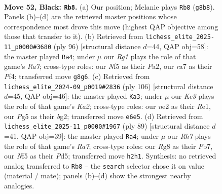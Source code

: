 \documentclass[11pt]{article}
\begin{document}
\clearpage

\begin{figure}[p]\centering
\begin{subfigure}{0.46\textwidth}\centering
\resizebox{\linewidth}{!}{%
\newchessgame
\chessboard[
  setfen={6r1/R7/3pk3/5npp/8/1p6/1R2NKPr/8 b - - 3 52},
  showmover=false,
  pgfstyle=straightmove, color=movearrow, markmove={g8-b8}
]}
\caption{}
\end{subfigure}\hfill
\begin{subfigure}{0.46\textwidth}\centering
\resizebox{\linewidth}{!}{%
\newchessgame
\chessboard[
  setfen={4r3/R3Pk2/2r5/8/2p2P2/2R3P1/P7/6K1 w - - 3 49},
  showmover=false,
  pgfstyle=straightmove, color=movearrow, markmove={a7-a4}
]}
\caption{}
\end{subfigure}
\\[4pt]
\begin{subfigure}{0.46\textwidth}\centering
\resizebox{\linewidth}{!}{%
\newchessgame
\chessboard[
  setfen={4r3/1nk1P3/8/p3R3/2P5/1P6/KP4b1/4R3 w - - 1 54},
  showmover=false,
  pgfstyle=straightmove, color=movearrow, markmove={a2-a3}
]}
\caption{}
\end{subfigure}\hfill
\begin{subfigure}{0.46\textwidth}\centering
\resizebox{\linewidth}{!}{%
\newchessgame
\chessboard[
  setfen={2R5/pp6/3k4/2pp2P1/8/4P3/r3NK2/8 b - - 1 45},
  showmover=false,
  pgfstyle=straightmove, color=movearrow, markmove={a2-a4}
]}
\caption{}
\end{subfigure}
\caption{\textbf{Move 52, Black: \texttt{Rb8}.} (a) Our position; Melanie plays \texttt{Rb8} (\texttt{g8b8}). Panels (b)--(d) are the retrieved master positions whose correspondence most drove this move (highest QAP objective among those that transfer to it). (b) Retrieved from \texttt{lichess\_elite\_2025-11\_p0000\#3680} (ply 96) [structural distance $d$=44, QAP obj=58]: the master played \texttt{Ra4}; under $\mu$ our \emph{Rg1} plays the role of that game's \emph{Ra7}; cross-type roles: our \emph{N}f5 as their \emph{P}a2, our \emph{r}a7 as their \emph{P}f4; transferred move \texttt{g8g6}. (c) Retrieved from \texttt{lichess\_elite\_2024-09\_p0019\#2836} (ply 106) [structural distance $d$=45, QAP obj=46]: the master played \texttt{Ka3}; under $\mu$ our \emph{Ke3} plays the role of that game's \emph{Ka2}; cross-type roles: our \emph{n}e2 as their \emph{R}e1, our \emph{P}g5 as their \emph{b}g2; transferred move \texttt{e6e5}. (d) Retrieved from \texttt{lichess\_elite\_2025-11\_p0000\#1967} (ply 89) [structural distance $d$=41, QAP obj=39]: the master played \texttt{Ra4}; under $\mu$ our \emph{Rh7} plays the role of that game's \emph{Ra7}; cross-type roles: our \emph{R}g8 as their \emph{P}b7, our \emph{N}f5 as their \emph{P}d5; transferred move \texttt{h2h1}. Synthesis: no retrieved analog transferred to \texttt{Rb8} -- the \texttt{search} selector chose it on value (material / mate); panels (b)--(d) show the strongest nearby analogies.}
\label{fig:thought-m103}
\end{figure}
\end{document}
